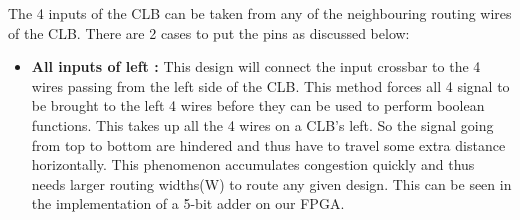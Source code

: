 The 4 inputs of the CLB can be taken from any of the neighbouring routing wires of the CLB. There are 2 cases to put the pins as discussed below:

\begin{itemize}
\item \textbf{All inputs of left :} This design will connect the input crossbar to the 4 wires passing from the left side of the CLB. This method forces all 4 signal to be brought to the left 4 wires before they can be used to perform boolean functions. This takes up all the 4 wires on a CLB's left. So the signal going from top to bottom are hindered and thus have to travel some extra distance horizontally. This phenomenon accumulates congestion quickly and thus needs larger routing widths(W) to route any given design. This can be seen in the implementation of a 5-bit adder on our FPGA.


\end{itemize}
